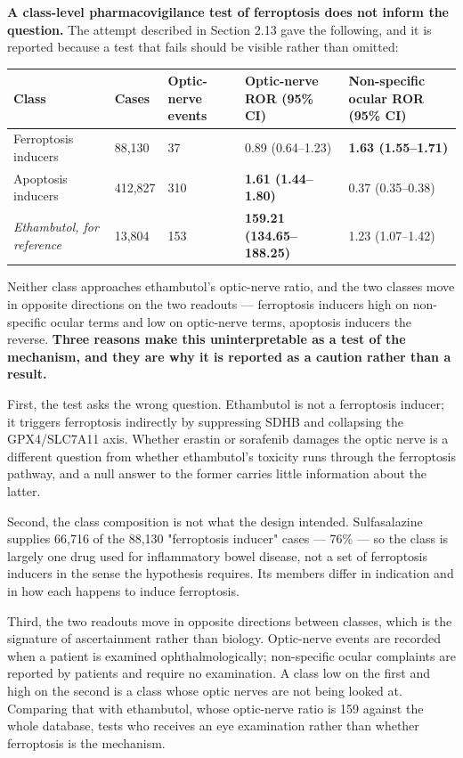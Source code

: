 \documentclass[utf8]{FrontiersinVancouver}
\begin{document}
\textbf{A class-level pharmacovigilance test of ferroptosis does not inform the question.} The attempt described in Section 2.13 gave the following, and it is reported because a test that fails should be visible rather than omitted:

\begin{table}[htbp]
\centering
\begin{tabular}{lllll}
\hline
Class & Cases & Optic-nerve events & Optic-nerve ROR (95\% CI) & Non-specific ocular ROR (95\% CI) \\
\hline
Ferroptosis inducers & 88,130 & 37 & 0.89 (0.64--1.23) & \textbf{1.63 (1.55--1.71)} \\
Apoptosis inducers & 412,827 & 310 & \textbf{1.61 (1.44--1.80)} & 0.37 (0.35--0.38) \\
\textit{Ethambutol, for reference} & 13,804 & 153 & \textbf{159.21 (134.65--188.25)} & 1.23 (1.07--1.42) \\
\hline
\end{tabular}
\end{table}

Neither class approaches ethambutol's optic-nerve ratio, and the two classes move in opposite directions on the two readouts --- ferroptosis inducers high on non-specific ocular terms and low on optic-nerve terms, apoptosis inducers the reverse. \textbf{Three reasons make this uninterpretable as a test of the mechanism, and they are why it is reported as a caution rather than a result.}

First, the test asks the wrong question. Ethambutol is not a ferroptosis inducer; it triggers ferroptosis indirectly by suppressing SDHB and collapsing the GPX4/SLC7A11 axis. Whether erastin or sorafenib damages the optic nerve is a different question from whether ethambutol's toxicity runs through the ferroptosis pathway, and a null answer to the former carries little information about the latter.

Second, the class composition is not what the design intended. Sulfasalazine supplies 66,716 of the 88,130 "ferroptosis inducer" cases --- 76\% --- so the class is largely one drug used for inflammatory bowel disease, not a set of ferroptosis inducers in the sense the hypothesis requires. Its members differ in indication and in how each happens to induce ferroptosis.

Third, the two readouts move in opposite directions between classes, which is the signature of ascertainment rather than biology. Optic-nerve events are recorded when a patient is examined ophthalmologically; non-specific ocular complaints are reported by patients and require no examination. A class low on the first and high on the second is a class whose optic nerves are not being looked at. Comparing that with ethambutol, whose optic-nerve ratio is 159 against the whole database, tests who receives an eye examination rather than whether ferroptosis is the mechanism.
\end{document}
